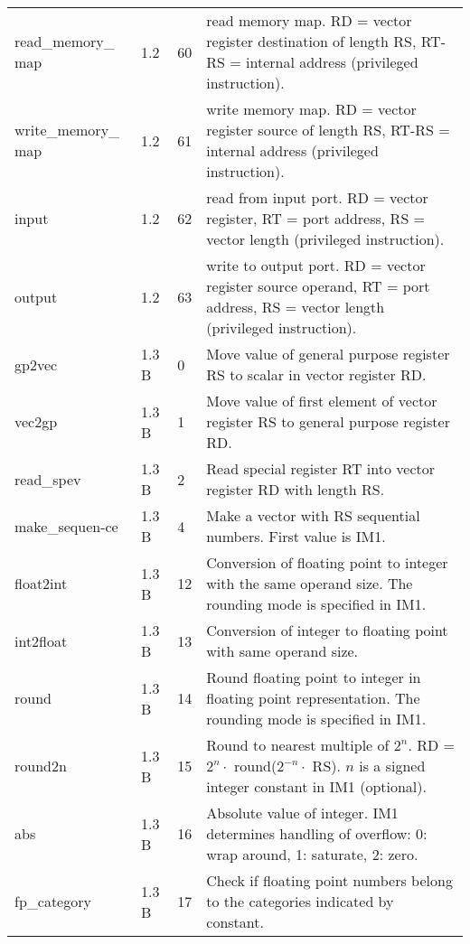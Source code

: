 \documentclass[forwardcom.tex]{subfiles}
\begin{document}
\begin{longtable} {|p{20mm}|p{10mm}|p{8mm}|p{75mm}|}
read\_memory\_ map & 1.2 & 60 & read memory map. RD = vector register destination of length RS, RT-RS = internal address (privileged instruction). \\
write\_memory\_ map & 1.2 & 61 & write memory map. RD = vector register source of length RS, RT-RS = internal address (privileged instruction). \\

input         & 1.2 & 62 & read from input port. RD = vector register, RT = port address, RS = vector length (privileged instruction). \\
output        & 1.2 & 63 & write to output port. RD = vector register source operand, RT = port address, RS = vector length (privileged instruction). \\

gp2vec        & 1.3 B &  0 & Move value of general purpose register RS to scalar in vector register RD. \\

vec2gp        & 1.3 B &  1 & Move value of first element of vector register RS to general purpose register RD. \\

read\_spev    & 1.3 B &  2 & Read special register RT into vector register RD with  length RS. \\
make\_sequen-ce& 1.3 B &  4 & Make a vector with RS sequential numbers. First value is IM1. \\

float2int     & 1.3 B & 12 & Conversion of floating point to integer with the same operand size. The rounding mode is specified in IM1. \\
int2float     & 1.3 B & 13 & Conversion of integer to floating point with same operand size. \\

round         & 1.3 B & 14 & Round floating point to integer in floating point  representation. The rounding mode is specified in IM1. \\
round2n       & 1.3 B & 15 & Round to nearest multiple of $2^n$. \newline 
RD = $2^n\cdot$ round($2^{-n}\cdot$ RS). $n$ is a signed integer constant in IM1 (optional). \\
abs           & 1.3 B & 16 & Absolute value of integer. IM1 determines handling of overflow: 0: wrap around, 1: saturate, 2: zero. \\

fp\_category  & 1.3 B & 17 & Check if floating point numbers belong to the categories indicated by constant. \\


\end{longtable}
\end{document}
